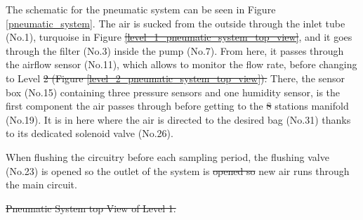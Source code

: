 \documentclass[a4paper,12pt,twoside]{article}
\providecommand{\DIFaddtex}[1]{{\protect\color{blue}\uwave{#1}}} %
\providecommand{\DIFdeltex}[1]{{\protect\color{red}\sout{#1}}}                      %
\providecommand{\DIFaddbegin}{} %
\providecommand{\DIFaddend}{} %
\providecommand{\DIFdelbegin}{} %
\providecommand{\DIFdelend}{} %
\providecommand{\DIFdelFL}[1]{\DIFdel{#1}} %
\providecommand{\DIFadd}[1]{\texorpdfstring{\DIFaddtex{#1}}{#1}} %
\providecommand{\DIFdel}[1]{\texorpdfstring{\DIFdeltex{#1}}{}} %
\newcommand{\DIFscaledelfig}{0.5}
\newlength{\DIFdelgraphicswidth} %
\newlength{\DIFdelgraphicsheight} %
\newcommand{\DIFaddincludegraphics}[2][]{{\color{blue}\fbox{\DIFOincludegraphics[#1]{#2}}}} %
\newcommand{\DIFdelincludegraphics}[2][]{%
\sbox{\DIFdelgraphicsbox}{\DIFOincludegraphics[#1]{#2}}%
\settoboxwidth{\DIFdelgraphicswidth}{\DIFdelgraphicsbox} %
\settoboxtotalheight{\DIFdelgraphicsheight}{\DIFdelgraphicsbox} %
\scalebox{\DIFscaledelfig}{%
\parbox[b]{\DIFdelgraphicswidth}{\usebox{\DIFdelgraphicsbox}\\[-\baselineskip] \rule{\DIFdelgraphicswidth}{0em}}\llap{\resizebox{\DIFdelgraphicswidth}{\DIFdelgraphicsheight}{%
\setlength{\unitlength}{\DIFdelgraphicswidth}%
\begin{picture}(1,1)%
\thicklines\linethickness{2pt} %
{\color[rgb]{1,0,0}\put(0,0){\framebox(1,1){}}}%
{\color[rgb]{1,0,0}\put(0,0){\line( 1,1){1}}}%
{\color[rgb]{1,0,0}\put(0,1){\line(1,-1){1}}}%
\end{picture}%
}\hspace*{3pt}}} %
} %
\DeclareRobustCommand{\DIFaddbegin}{\DIFOaddbegin \let\includegraphics\DIFaddincludegraphics} %
\DeclareRobustCommand{\DIFaddend}{\DIFOaddend \let\includegraphics\DIFOincludegraphics} %
\DeclareRobustCommand{\DIFdelbegin}{\DIFOdelbegin \let\includegraphics\DIFdelincludegraphics} %
\DeclareRobustCommand{\DIFdelend}{\DIFOaddend \let\includegraphics\DIFOincludegraphics} %
\begin{document}
\DIFaddend The schematic for the pneumatic system can be seen in Figure \ref{pneumatic_system}. The air is sucked from the outside through the inlet tube (No.1), turquoise in Figure \DIFdelbegin \DIFdel{\ref{level_1_pneumatic_system_top_view}}\DIFdelend \DIFaddbegin \DIFadd{\ref{pneumatic_system_cad}}\DIFaddend , and it goes through the filter (No.3) inside the pump (No.7). From here, it passes through the airflow sensor (No.11), which allows to monitor the flow rate, before changing to Level \DIFdelbegin \DIFdel{2 (Figure \ref{level_2_pneumatic_system_top_view}). }\DIFdelend \DIFaddbegin \DIFadd{2. }\DIFaddend There, the sensor box (No.15) containing three pressure sensors and one humidity sensor, is the first component the air passes through before getting to the \DIFdelbegin \DIFdel{8 }\DIFdelend \DIFaddbegin \DIFadd{six }\DIFaddend stations manifold (No.19). It is in here where the air is directed to the desired bag (No.31) thanks to its dedicated solenoid valve (No.26).
\DIFaddbegin 

\DIFaddend When flushing the circuitry before each sampling period, the flushing valve (No.23) is opened so \DIFaddbegin \DIFadd{that }\DIFaddend the outlet of the system is \DIFdelbegin \DIFdel{opened so }\DIFdelend \DIFaddbegin \DIFadd{open and }\DIFaddend new air runs through the main circuit. 

\DIFdelbegin %
{%
\DIFdelFL{Pneumatic System top View of Level 1.}}
\DIFdelend %
\end{document}
